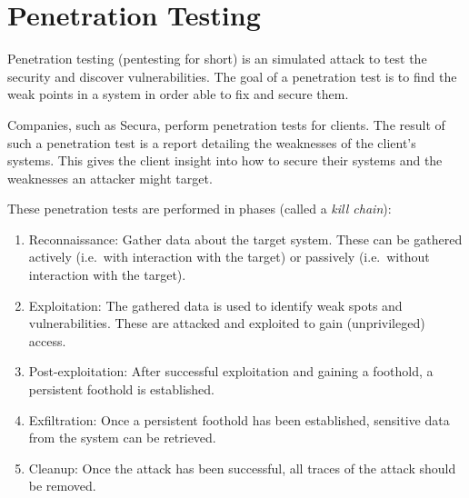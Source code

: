 \section{Penetration Testing}
Penetration testing (pentesting for short) is an simulated attack to test the security and discover vulnerabilities. The goal of a penetration test is to find the weak points in a system in order able to fix and secure them.

Companies, such as Secura, perform penetration tests for clients. The result of such a penetration test is a report detailing the weaknesses of the client's systems. This gives the client insight into how to secure their systems and the weaknesses an attacker might target.

These penetration tests are performed in phases (called a \emph{kill chain}):
\begin{enumerate}
    \item Reconnaissance: Gather data about the target system. These can be gathered actively (i.e.\ with interaction with the target) or passively (i.e.\ without interaction with the target).
    \item Exploitation: The gathered data is used to identify weak spots and vulnerabilities. These are attacked and exploited to gain (unprivileged) access.
    \item Post-exploitation: After successful exploitation and gaining a foothold, a persistent foothold is established.
    \item Exfiltration: Once a persistent foothold has been established, sensitive data from the system can be retrieved.
    \item Cleanup: Once the attack has been successful, all traces of the attack should be removed.
\end{enumerate}

\medskip

